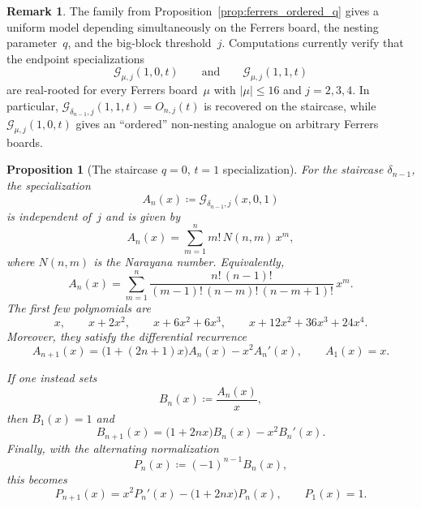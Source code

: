 \documentclass[11pt,reqno]{amsart}
\newtheorem{proposition}[theorem]{Proposition}
\theoremstyle{definition}
\newtheorem{remark}[theorem]{Remark}
\begin{document}
\begin{remark}\label{rem:ferrers_ordered_q_data}
The family from Proposition~\ref{prop:ferrers_ordered_q} gives a uniform model
depending simultaneously on the Ferrers board, the nesting parameter~$q$, and
the big-block threshold~$j$.
Computations currently verify that the endpoint specializations
\[
  \mathcal G_{\mu,j}(1,0,t)
  \qquad\text{and}\qquad
  \mathcal G_{\mu,j}(1,1,t)
\]
are real-rooted for every Ferrers board~$\mu$ with $|\mu| \leq 16$ and
$j=2,3,4$.
In particular, $\mathcal G_{\delta_{n-1},j}(1,1,t)=O_{n,j}(t)$ is recovered on
the staircase, while $\mathcal G_{\mu,j}(1,0,t)$ gives an ``ordered''
non-nesting analogue on arbitrary Ferrers boards.
\end{remark}

\begin{proposition}[The staircase $q=0$, $t=1$ specialization]\label{prop:ordered_narayana}
For the staircase $\delta_{n-1}$, the specialization
\[
  A_n(x)
  \coloneqq
  \mathcal G_{\delta_{n-1},j}(x,0,1)
\]
is independent of~$j$ and is given by
\[
  A_n(x)
  =
  \sum_{m=1}^{n} m!\,N(n,m)\,x^m,
\]
where $N(n,m)$ is the Narayana number.
Equivalently,
\[
  A_n(x)
  =
  \sum_{m=1}^{n}
  \frac{n!\,(n-1)!}{(m-1)!\,(n-m)!\,(n-m+1)!}\,x^m.
\]
The first few polynomials are
\[
  x,\qquad
  x+2x^2,\qquad
  x+6x^2+6x^3,\qquad
  x+12x^2+36x^3+24x^4.
\]
Moreover, they satisfy the differential recurrence
\begin{equation}\label{eq:ordered_narayana_recur}
  A_{n+1}(x)
  =
  \bigl(1+(2n+1)x\bigr)A_n(x)
  -
  x^2 A_n'(x),
  \qquad
  A_1(x)=x.
\end{equation}

If one instead sets
\[
  B_n(x) \coloneqq \frac{A_n(x)}{x},
\]
then $B_1(x)=1$ and
\[
  B_{n+1}(x)
  =
  \bigl(1+2n x\bigr)B_n(x)
  -
  x^2 B_n'(x).
\]
Finally, with the alternating normalization
\[
  P_n(x) \coloneqq (-1)^{n-1} B_n(x),
\]
this becomes
\[
  P_{n+1}(x)
  =
  x^2 P_n'(x) - \bigl(1+2n x\bigr) P_n(x),
  \qquad
  P_1(x)=1.
\]
\end{proposition}
\end{document}
